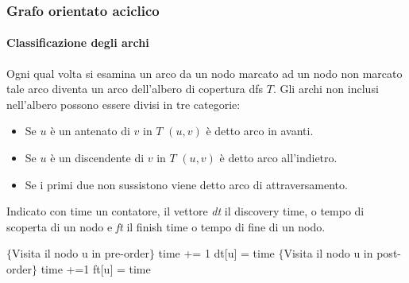 \subsubsection{Grafo orientato aciclico}
\paragraph{Classificazione degli archi}
Ogni qual volta si esamina un arco da un nodo marcato ad un nodo non marcato tale arco diventa un arco dell'albero di copertura dfs $T$. Gli archi non 
inclusi nell'albero possono essere divisi in tre categorie:
\begin{itemize}
\item Se $u$ \`e un antenato di $v$ in $T$ $(u, v)$ \`e detto arco in avanti.
\item Se $u$ \`e un discendente di $v$ in $T$ $(u, v)$ \`e detto arco all'indietro.
\item Se i primi due non sussistono viene detto arco di attraversamento. 
\end{itemize}
Indicato con time un contatore, il vettore \emph{dt} il discovery time, o tempo di scoperta di un nodo e \emph{ft} il finish time o tempo di fine di un 
nodo.\\
\begin{algorithm}[H]
\DontPrintSemicolon
{}

\caption{\protect{}}
$\{$Visita il nodo u in pre-order$\}$\;
time += 1\;
dt[u] = time\;
$\{$Visita il nodo u in post-order$\}$\;
time +=1\;
ft[u] = time\;
\end{algorithm}
